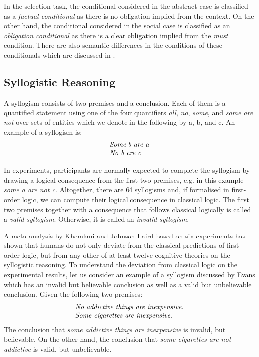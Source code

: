 In the selection task, the conditional considered in the abstract case is classified as a \textit{factual conditional} as there is no obligation implied from the context. On the other hand, the conditional considered in the social case is classified as an \textit{obligation conditional} as there is a clear obligation implied from the \textit{must} condition. There are also semantic differences in the conditions of these conditionals which are discussed in \cite{saldanhaobligation}.

\subsection{Syllogistic Reasoning}

A syllogism consists of two premises and a conclusion. Each of them is a quantified statement using one of the four quantifiers \textit{all}, \textit{no}, \textit{some}, and \textit{some are not} over sets of entities which we denote in the following by a, b, and c. An example of a syllogism is:
\[
\begin{array}{l}
\mbox{\textit{Some b are a}}\\
\mbox{\textit{No b are c}}
\end{array}
\]

In experiments, participants are normally expected to complete the syllogism by drawing a logical consequence from the first two premises, e.g. in this example \textit{some a are not c}. Altogether, there are 64 syllogisms and, if formalised in first-order logic, we can compute their logical consequence in classical logic. The first two premises together with a consequence that follows classical logically is called a \textit{valid syllogism}. Otherwise, it is called an \textit{invalid syllogism}.

A meta-analysis by Khemlani and Johnson Laird \cite{khemlani2012theories} based on six experiments has shown that humans do not only deviate from the classical predictions of first-order logic, but from any other of at least twelve cognitive theories on the syllogistic reasoning. To understand the deviation from classical logic on the experimental results, let us consider an example of a syllogism discussed by Evans \cite{evans2013reasoning} which has an invalid but believable conclusion as well as a valid but unbelievable conclusion. Given the following two premises:
\[
\begin{array}{l}
\mbox{\textit{No addictive things are inexpensive.}}\\
\mbox{\textit{Some cigarettes are inexpensive.}}
\end{array}
\]
The conclusion that \textit{some addictive things are inexpensive} is invalid, but believable. On the other hand, the conclusion that \textit{some cigarettes are not addictive} is valid, but unbelievable.

